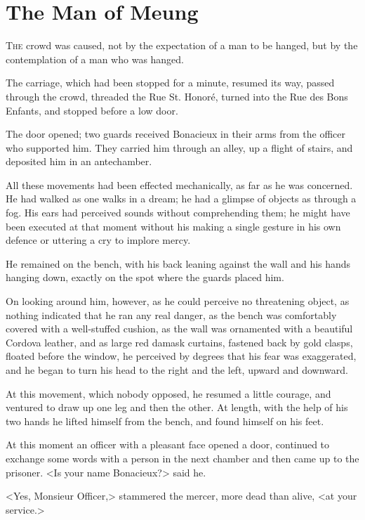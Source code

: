 
\chapter{The Man of Meung}

\lettrine[]{T}{he} crowd was caused, not by the expectation of a man to be hanged, but by the contemplation of a man who was hanged. 

\zz
The carriage, which had been stopped for a minute, resumed its way, passed through the crowd, threaded the Rue St. Honoré, turned into the Rue des Bons Enfants, and stopped before a low door. 

The door opened; two guards received Bonacieux in their arms from the officer who supported him. They carried him through an alley, up a flight of stairs, and deposited him in an antechamber. 

All these movements had been effected mechanically, as far as he was concerned. He had walked as one walks in a dream; he had a glimpse of objects as through a fog. His ears had perceived sounds without comprehending them; he might have been executed at that moment without his making a single gesture in his own defence or uttering a cry to implore mercy. 

He remained on the bench, with his back leaning against the wall and his hands hanging down, exactly on the spot where the guards placed him. 

On looking around him, however, as he could perceive no threatening object, as nothing indicated that he ran any real danger, as the bench was comfortably covered with a well-stuffed cushion, as the wall was ornamented with a beautiful Cordova leather, and as large red damask curtains, fastened back by gold clasps, floated before the window, he perceived by degrees that his fear was exaggerated, and he began to turn his head to the right and the left, upward and downward. 

At this movement, which nobody opposed, he resumed a little courage, and ventured to draw up one leg and then the other. At length, with the help of his two hands he lifted himself from the bench, and found himself on his feet. 

At this moment an officer with a pleasant face opened a door, continued to exchange some words with a person in the next chamber and then came up to the prisoner. <Is your name Bonacieux?> said he. 

<Yes, Monsieur Officer,> stammered the mercer, more dead than alive, <at your service.> 

